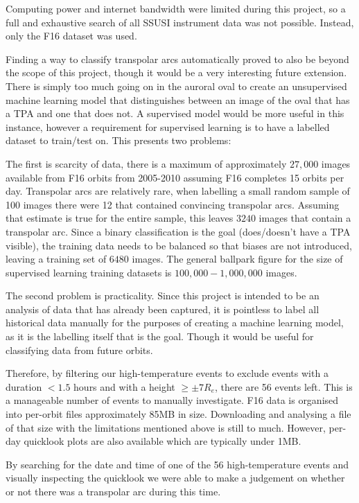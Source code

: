 \documentclass[12pt]{article}
\begin{document}
Computing power and internet bandwidth were limited during this project, so a full and exhaustive search of all SSUSI instrument data was not possible. Instead, only the F16 dataset was used.

Finding a way to classify transpolar arcs automatically proved to also be beyond the scope of this project, though it would be a very interesting future extension. There is simply too much going on in the auroral oval to create an unsupervised machine learning model that distinguishes between an image of the oval that has a TPA and one that does not. A supervised model would be more useful in this instance, however a requirement for supervised learning is to have a labelled dataset to train/test on. This presents two problems:

The first is scarcity of data, there is a maximum of approximately $27,000$ images available from F16 orbits from 2005-2010 assuming F16 completes 15 orbits per day. Transpolar arcs are relatively rare, when labelling a small random sample of 100 images there were 12 that contained convincing transpolar arcs. Assuming that estimate is true for the entire sample, this leaves $3240$ images that contain a transpolar arc. Since a binary classification is the goal (does/doesn't have a TPA visible), the training data needs to be balanced so that biases are not introduced, leaving a training set of $6480$ images. The general ballpark figure for the size of supervised learning training datasets is $100,000-1,000,000$ images.

The second problem is practicality. Since this project is intended to be an analysis of data that has already been captured, it is pointless to label all historical data manually for the purposes of creating a machine learning model, as it is the labelling itself that is the goal. Though it would be useful for classifying data from future orbits.

Therefore, by filtering our high-temperature events to exclude events with a duration $< 1.5$ hours and with a height $\ge\pm7R_e$, there are 56 events left. This is a manageable number of events to manually investigate. F16 data is organised into per-orbit files approximately 85MB in size. Downloading and analysing a file of that size with the limitations mentioned above is still to much. However, per-day quicklook plots are also available which are typically under 1MB. 

By searching for the date and time of one of the 56 high-temperature events and visually inspecting the quicklook we were able to make a judgement on whether or not there was a transpolar arc during this time.
\end{document}
